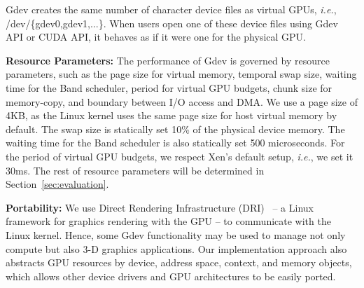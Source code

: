 Gdev creates the same number of character device files as virtual GPUs,
\textit{i.e.}, /dev/\{gdev0,gdev1,...\}.
When users open one of these device files using Gdev API or CUDA API,
it behaves as if it were one for the physical GPU.

\textbf{Resource Parameters:}
The performance of Gdev is governed by resource parameters, such as the
page size for virtual memory, temporal swap size, waiting time for the
Band scheduler, period for virtual GPU budgets, chunk size
for memory-copy, and boundary between I/O access and DMA.
We use a page size of 4KB, as the Linux kernel uses the same page size
for host virtual memory by default.
The swap size is statically set 10\% of the physical device memory.
The waiting time for the Band scheduler is also statically set 500
microseconds.
For the period of virtual GPU budgets, we respect Xen's default setup,
\textit{i.e.}, we set it 30ms.
The rest of resource parameters will be determined in
Section~\ref{sec:evaluation}.

\textbf{Portability:}
We use Direct Rendering Infrastructure (DRI)~\cite{DRI} -- a Linux
framework for graphics rendering with the GPU -- to communicate with the
Linux kernel.
Hence, some Gdev functionality may be used to manage not only compute
but also 3-D graphics applications.
Our implementation approach also abstracts GPU resources by device,
address space, context, and memory objects, which allows other device
drivers and GPU architectures to be easily ported.

